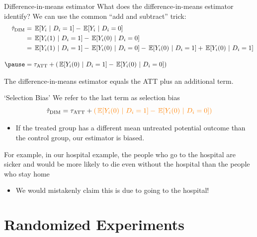 \documentclass[aspectratio=169,t,11pt,table]{beamer}
\begin{document}
\begin{frame}{Difference-in-means estimator}
  What does the difference-in-means estimator identify? We can use the common ``add and subtract'' trick:
  \begin{align*}
    \hat{\tau}_{\text{DIM}} &= \expec{Y_{i}}{D_i = 1} - \expec{Y_{i}}{D_i = 0} \\
    &= \expec{Y_{i}(1)}{D_i = 1} - \expec{Y_{i}(0)}{D_i = 0} \\
    &= \expec{Y_{i}(1)}{D_i = 1} - \expec{Y_{i}(0)}{D_i = 0} - \expec{Y_{i}(0)}{D_i = 1} + \expec{Y_{i}(0)}{D_i = 1} \\[1em]
    \pause
    &= \tau_{\text{ATT}} + \left( \expec{Y_{i}(0)}{D_i = 1} - \expec{Y_{i}(0)}{D_i = 0} \right)
  \end{align*}  

  \bigskip
  The difference-in-means estimator equals the ATT plus an additional term.
\end{frame}

\begin{frame}{`Selection Bias'}
  We refer to the last term as {\color{orange} selection bias}
  $$
    \hat{\tau}_{\text{DIM}} = \tau_{\text{ATT}} + {\color{orange} \left( \expec{Y_{i}(0)}{D_i = 1} - \expec{Y_{i}(0)}{D_i = 0} \right) }
  $$

  \begin{itemize}
    \item If the treated group has a different mean untreated potential outcome than the control group, our estimator is biased.
  \end{itemize}

  \pause
  \bigskip
  For example, in our hospital example, the people who go to the hospital are sicker and would be more likely to die even without the hospital than the people who stay home
  \begin{itemize}
    \item We would mistakenly claim this is due to going to the hospital!
  \end{itemize}
\end{frame}

\section{Randomized Experiments}
\end{document}
